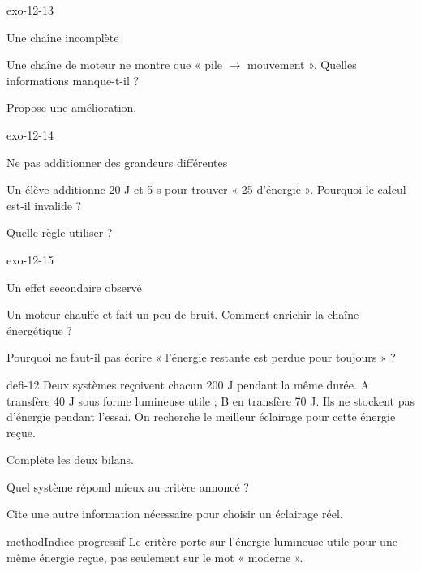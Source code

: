 \documentclass[12pt,twoside,openany]{book}
\begin{document}
\begin{blocLivre}{exo-12-13}
\begin{exercice}[3]{Une chaîne incomplète}
\begin{questions}
\item Une chaîne de moteur ne montre que « pile \(\rightarrow\) mouvement ». Quelles informations manque-t-il ?
\item Propose une amélioration.
\end{questions}
\end{exercice}\end{blocLivre}
\begin{blocLivre}{exo-12-14}
\begin{exercice}[3]{Ne pas additionner des grandeurs différentes}
\begin{questions}
\item Un élève additionne 20 J et 5 s pour trouver « 25 d’énergie ». Pourquoi le calcul est-il invalide ?
\item Quelle règle utiliser ?
\end{questions}
\end{exercice}\end{blocLivre}
\begin{blocLivre}{exo-12-15}
\begin{exercice}[3]{Un effet secondaire observé}
\begin{questions}
\item Un moteur chauffe et fait un peu de bruit. Comment enrichir la chaîne énergétique ?
\item Pourquoi ne faut-il pas écrire « l’énergie restante est perdue pour toujours » ?
\end{questions}
\end{exercice}\end{blocLivre}
\label{defi-ex-12}
\begin{pcFiche}{defi-12}
Deux systèmes reçoivent chacun 200 J pendant la même durée. A transfère 40 J sous forme lumineuse utile ; B en transfère 70 J. Ils ne stockent pas d’énergie pendant l’essai. On recherche le meilleur éclairage pour cette énergie reçue.\par
{}
\begin{questions}
\item Complète les deux bilans.
\item Quel système répond mieux au critère annoncé ?
\item Cite une autre information nécessaire pour choisir un éclairage réel.
\end{questions}
\begin{pcEncadre}{method}{Indice progressif}
Le critère porte sur l’énergie lumineuse utile pour une même énergie reçue, pas seulement sur le mot « moderne ».\par
\end{pcEncadre}
\end{pcFiche}
\end{document}
